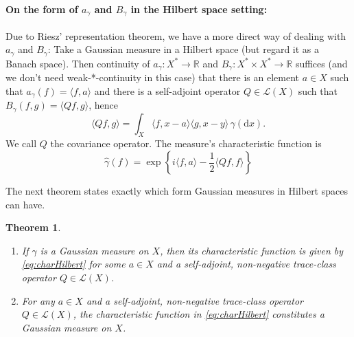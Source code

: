 \documentclass{scrartcl}
\newtheorem{theorem}{Theorem}
\theoremstyle{definition}
\theoremstyle{remark}
\newcommand{\de}{\mathrm d}
\newcommand{\R}{\mathbb R}
\begin{document}
\begin{itemize}
\paragraph{On the form of $a_\gamma$ and $B_\gamma$ in the Hilbert space setting:} Due to Riesz' representation theorem, we have a more direct way of dealing with $a_\gamma$ and $B_\gamma$: Take a Gaussian measure in a Hilbert space (but regard it as a Banach space). Then continuity of $a_\gamma : X^*\to \R$ and $B_\gamma: X^*\times X^*\to \R$ suffices (and we don't need weak-*-continuity in this case) that there is an element $a\in X$ such that $a_\gamma(f) = \langle f, a\rangle$ and there is a self-adjoint operator $Q\in\mathcal L(X)$ such that $B_\gamma(f,g) = \langle Q f, g\rangle$, hence
\begin{displaymath}
\langle Qf, g\rangle = \int_X \langle f, x-a\rangle \langle g, x-y\rangle \, \gamma(\de x).
\end{displaymath} 
We call $Q$ the covariance operator. The measure's characteristic function is
\begin{equation}\label{eq:charHilbert}
\hat \gamma(f) = \exp\left\{i\langle f, a\rangle - \frac{1}{2}\langle Qf, f\rangle\right\}
\end{equation}


The next theorem states exactly which form Gaussian measures in Hilbert spaces can have.

\begin{theorem}
\begin{enumerate}
\item If $\gamma$ is a Gaussian measure on $X$, then its characteristic function is given by \eqref{eq:charHilbert} for some $a\in X$ and a self-adjoint, non-negative trace-class operator $Q\in \mathcal L(X)$.
\item For any $a\in X$ and a self-adjoint, non-negative trace-class operator $Q\in \mathcal L(X)$, the characteristic function in \eqref{eq:charHilbert} constitutes a Gaussian measure on $X$.
\end{enumerate}
\end{theorem}


\end{itemize}
\end{document}
